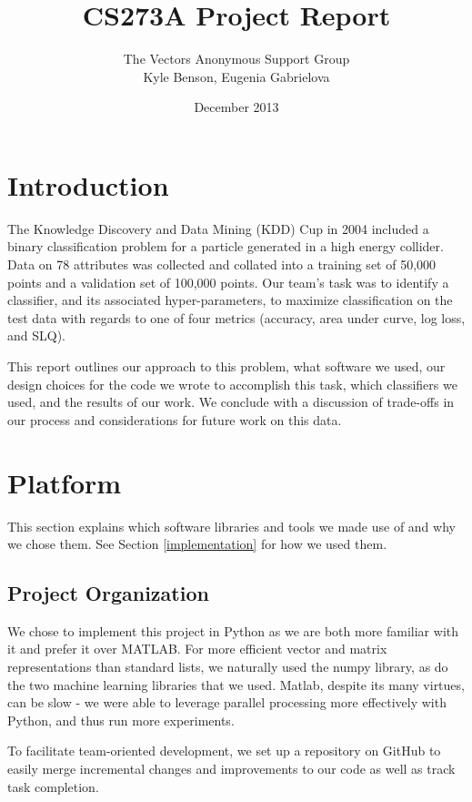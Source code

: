 \documentclass{article}
\title{CS273A Project Report}
\author{The Vectors Anonymous Support Group\\Kyle Benson, Eugenia Gabrielova}
\date{December 2013}
\begin{document}
\maketitle

\section{Introduction}

The Knowledge Discovery and Data Mining (KDD) Cup in 2004 included a binary classification problem for a particle generated in a high energy collider.
Data on 78 attributes was collected and collated into a training set of 50,000 points and a validation set of 100,000 points.
Our team's task was to identify a classifier, and its associated hyper-parameters, to maximize classification on the test data with regards to one of four metrics (accuracy, area under curve, log loss, and SLQ).

This report outlines our approach to this problem, what software we used, our design choices for the code we wrote to accomplish this task, which classifiers we used, and the results of our work. We conclude with a discussion of trade-offs in our process and considerations for future work on this data. 


\section{Platform}

This section explains which software libraries and tools we made use of and why we chose them.
See Section \ref{implementation} for how we used them.

\subsection{Project Organization}
We chose to implement this project in Python as we are both more familiar with it and prefer it over MATLAB\textregistered.
For more efficient vector and matrix representations than standard lists, we naturally used the numpy library, as do the two machine learning libraries that we used.
Matlab, despite its many virtues, can be slow - we were able to leverage parallel processing more effectively with Python, and thus run more experiments.

To facilitate team-oriented development, we set up a repository on GitHub to easily merge incremental changes and improvements to our code as well as track task completion. 
\end{document}
